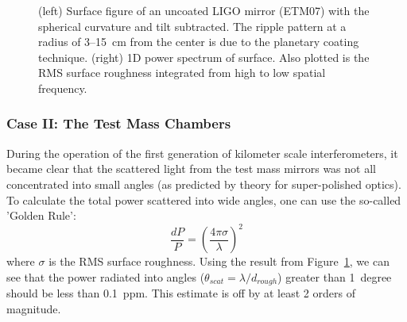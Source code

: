 \begin{figure}
    \centering
    \qquad
    \caption{(left) Surface figure of an uncoated LIGO mirror (ETM07) with the
      spherical curvature and tilt subtracted. The ripple pattern at a radius
      of 3--15~cm from the center is due to the planetary coating technique.
      (right) 1D power spectrum of surface. Also
      plotted is the RMS surface roughness integrated from high to low
      spatial frequency.}
    \label{fig:PhaseMap}
\end{figure}


\subsubsection{Case II: The Test Mass Chambers}
During the operation of the first generation of kilometer scale interferometers,
it became clear that the scattered light from the test mass mirrors was not
all concentrated into small angles (as predicted by theory for super-polished
optics). To calculate the total power scattered into wide angles, one can use the
so-called 'Golden Rule':
\begin{equation}
\frac{dP}{P} = \left( \frac{4 \pi \sigma}{\lambda} \right)^2
\end{equation}
where $\sigma$ is the RMS surface roughness. Using the result from
Figure~\ref{fig:PhaseMap}, we can see that the power radiated into
angles ($\theta_{scat} = \lambda / d_{rough}$) greater than 1~degree should be
less than 0.1~ppm. This estimate is off by at least 2 orders of magnitude.

